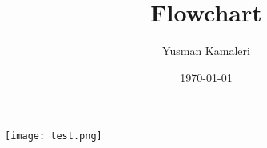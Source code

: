 \documentclass[11pt]{article}
\author{Yusman Kamaleri}
\date{\today}
\title{Flowchart}
\begin{document}
\maketitle
\tableofcontents

\begin{center}
\texttt{[image: test.png]}
\end{center}
\end{document}
